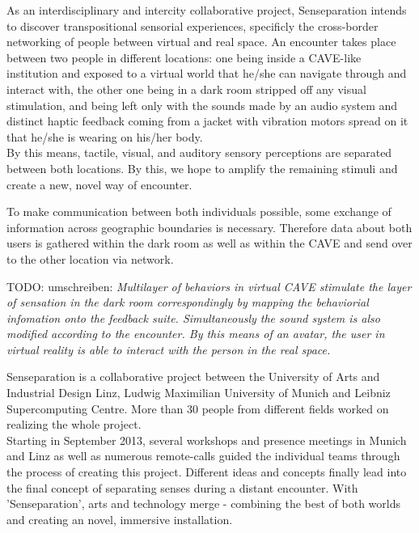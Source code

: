 \documentclass[conference]{acmsiggraph}
\begin{document}
As an interdisciplinary and intercity collaborative project, Senseparation intends to discover transpositional sensorial experiences, specificly the cross-border networking of people between virtual and real space.
An encounter takes place between two people in different locations: one being inside a CAVE-like institution and exposed to a virtual world that he/she can navigate through and interact with, the other one being in a dark room stripped off any visual stimulation, and being left only with the sounds made by an audio system and distinct haptic feedback coming from a jacket with vibration motors spread on it that he/she is wearing on his/her body.\\
By this means, tactile, visual, and auditory sensory perceptions are separated between both locations. By this, we hope to amplify the remaining stimuli and create a new, novel way of encounter.

To make communication between both individuals possible, some exchange of information across geographic boundaries is necessary. Therefore data about both users is gathered within the dark room as well as within the CAVE and send over to the other location via network.


TODO: umschreiben: \textit{Multilayer of behaviors in virtual CAVE stimulate the layer of sensation in the dark room correspondingly by mapping the behaviorial infomation onto the feedback suite. Simultaneously the sound system is also modified according to the encounter. By this means of an avatar, the user in virtual reality is able to interact with the person in the real space.}

Senseparation is a collaborative project between the University of Arts and Industrial Design Linz, Ludwig Maximilian University of Munich and Leibniz Supercomputing Centre. More than 30 people from different fields worked on realizing the whole project.\\
Starting in September 2013, several workshops and presence meetings in Munich and Linz as well as numerous remote-calls guided the individual teams through the process of creating this project.
Different ideas and concepts finally lead into the final concept of separating senses during a distant encounter. With 'Senseparation', arts and technology merge - combining the best of both worlds and creating an novel, immersive installation.
\end{document}

